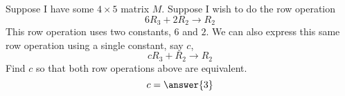 \documentclass{ximera}
\begin{document}
\begin{exercise}
  Suppose I have some $4\times 5$ matrix $M$. Suppose I wish to do the
  row operation
  \[
  6R_3 + 2R_2 \to R_2
  \]
  This row operation uses two constants, $6$ and $2$.  We can also
  express this same row operation using a single constant, say $c$,
  \[
  c R_3 +R_2 \to R_2
  \]
  Find $c$ so that both row operations above are equivalent.
  \[
  c=\answer{3}
  \]
\end{exercise}
\end{document}
